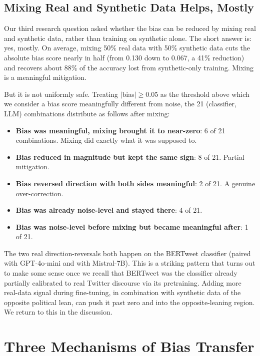 \documentclass[11pt]{article}
\begin{document}
\subsection{Mixing Real and Synthetic Data Helps, Mostly}

Our third research question asked whether the bias can be reduced by mixing real and synthetic data, rather than training on synthetic alone. The short answer is: yes, mostly. On average, mixing 50\% real data with 50\% synthetic data cuts the absolute bias score nearly in half (from 0.130 down to 0.067, a 41\% reduction) and recovers about 88\% of the accuracy lost from synthetic-only training. Mixing is a meaningful mitigation.

But it is not uniformly safe. Treating $|$bias$| \geq 0.05$ as the threshold above which we consider a bias score meaningfully different from noise, the 21 (classifier, LLM) combinations distribute as follows after mixing:

\begin{itemize}
    \item \textbf{Bias was meaningful, mixing brought it to near-zero}: 6 of 21 combinations. Mixing did exactly what it was supposed to.
    \item \textbf{Bias reduced in magnitude but kept the same sign}: 8 of 21. Partial mitigation.
    \item \textbf{Bias reversed direction with both sides meaningful}: 2 of 21. A genuine over-correction.
    \item \textbf{Bias was already noise-level and stayed there}: 4 of 21.
    \item \textbf{Bias was noise-level before mixing but became meaningful after}: 1 of 21.
\end{itemize}

The two real direction-reversals both happen on the BERTweet classifier (paired with GPT-4o-mini and with Mistral-7B). This is a striking pattern that turns out to make some sense once we recall that BERTweet was the classifier already partially calibrated to real Twitter discourse via its pretraining. Adding more real-data signal during fine-tuning, in combination with synthetic data of the opposite political lean, can push it past zero and into the opposite-leaning region. We return to this in the discussion.

\section{Three Mechanisms of Bias Transfer}
\label{sec:mechanisms}
\end{document}
